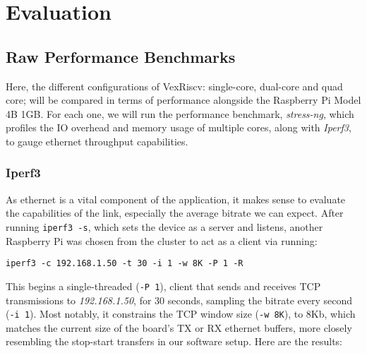 \chapter[Evaluation]{Evaluation}
\label{Chap:Evaluation}

\section{Raw Performance Benchmarks}
Here, the different configurations of VexRiscv: single-core, dual-core and quad core; will be compared in terms of performance alongside the Raspberry Pi Model 4B 1GB. For each one, we will run the performance benchmark, \textit{stress-ng}, which profiles the IO overhead and memory usage of multiple cores, along with \textit{Iperf3}, to gauge ethernet throughput capabilities.

\subsection{Iperf3}
As ethernet is a vital component of the application, it makes sense to evaluate the capabilities of the link, especially the average bitrate we can expect. After running \texttt{iperf3 -s}, which sets the device as a server and listens, another Raspberry Pi was chosen from the cluster to act as a client via running:
\begin{verbatim}    
iperf3 -c 192.168.1.50 -t 30 -i 1 -w 8K -P 1 -R
\end{verbatim}
This begins a single-threaded (\texttt{-P 1}), client that sends and receives TCP transmissions to \textit{192.168.1.50}, for 30 seconds, sampling the bitrate every second (\texttt{-i 1}). Most notably, it constrains the TCP window size (\texttt{-w 8K}), to 8Kb, which matches the current size of the board's TX or RX ethernet buffers, more closely resembling the stop-start transfers in our software setup. Here are the results:

